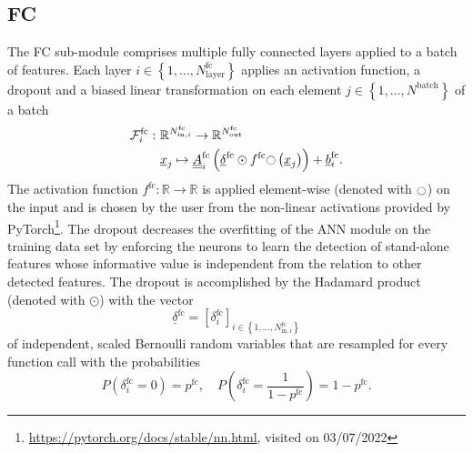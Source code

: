 \subsection*{FC}
The FC sub-module comprises multiple fully connected layers
applied to a batch of features.
Each layer 
$
    i 
    \in 
    \left\{
        1, \dots, N^\text{fc}_\text{layer}
    \right\}
$ 
applies
an activation function,
a dropout
and a biased linear transformation
on each element
$
    j
    \in 
    \left\{
        1, \dots, N^\text{batch}
    \right\}
$
of a batch
\begin{align} \label{eq:FC}
    \mathcal{F}^\text{fc}_i
    :\ &
    \mathbb{R}^{
        N^\text{fc}_{\text{in}, i}
    }
    \rightarrow 
    \mathbb{R}^{
            N^\text{fc}_\text{out}
        }
    \nonumber \\ &
    \underline{x}_j%
    \mapsto
    \underline{\underline A}^\text{fc}_i
    \left(
        \underline{\delta}^\text{fc}
        \odot
        f^\text{fc} \fullmoon \left(
            \underline{x}_j%
        \right)
    \right)
    + \underline b^\text{fc}_i
    .
\end{align}
The activation function 
$
    f^\text{fc}: \mathbb{R} \rightarrow \mathbb{R}
$
is applied element-wise (denoted with $\fullmoon$) on the input
and is chosen by the user from the non-linear activations
provided by PyTorch\footnote{
    \url{https://pytorch.org/docs/stable/nn.html}, visited on 03/07/2022
}.
The dropout\cite{Hinton2012} decreases the overfitting of the ANN module on the training data set
by enforcing the neurons to learn the detection of stand-alone features
whose informative value is independent from
the relation to other detected features.
The dropout is accomplished
by the Hadamard product (denoted with $\odot$)
with the vector
\begin{equation}
    \underline{\delta}^\text{fc}
    =
    \left[
        \delta^\text{fc}_i
    \right]_{
        i \in \left\{
            1, \dots, N^\text{fc}_{\text{in}, i}
        \right\}
    }
\end{equation}
of independent, scaled Bernoulli random variables
that are resampled for every function call
with the probabilities
\begin{equation}
    P \left(
        \delta^\text{fc}_i = 0
    \right)
    = p^\text{fc}
    ,\quad
    P \left(
        \delta^\text{fc}_i = \frac{1}{1-p^\text{fc}}
    \right)
    = 1 - p^\text{fc}
    .
\end{equation}

